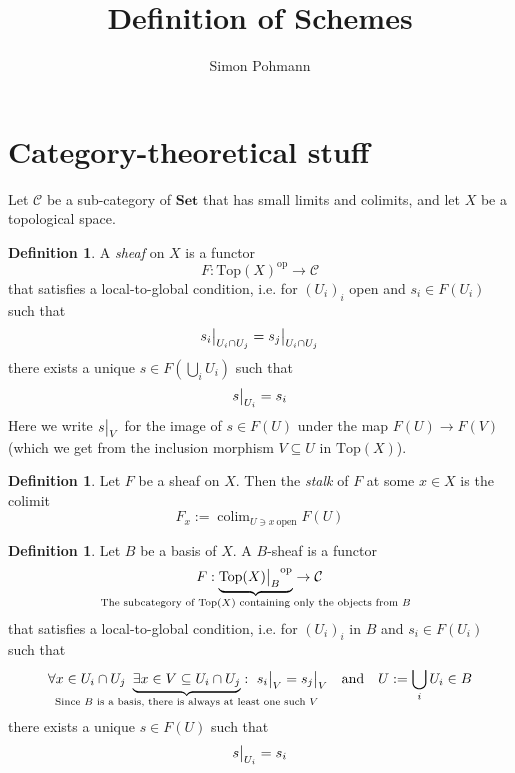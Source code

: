 \documentclass{scrartcl}
\title{Definition of Schemes}
\author{Simon Pohmann}
\newcommand{\Set}{\mathrm{\textbf{Set}}}
\newcommand{\Top}{\mathrm{Top}}
\DeclareMathOperator*{\colim}{colim}
\newcommand\restr[2]{{
    \left.\kern-\nulldelimiterspace
    #1
    \vphantom{\big|}
    \right|_{#2}
}}
\theoremstyle{definition}
\newtheorem{definition}[prop]{Definition}
\begin{document}
\maketitle
\tableofcontents

\section{Category-theoretical stuff}
Let $\mathcal{C}$ be a sub-category of $\Set$ that has small limits and colimits, and let $X$ be a topological space.
\begin{definition}
    A \emph{sheaf} on $X$ is a functor
    \begin{equation*}
        F: \Top(X)^{\mathrm{op}} \to \mathcal{C}
    \end{equation*}
    that satisfies a local-to-global condition, i.e. for $(U_i)_i$ open and $s_i \in F(U_i)$ such that
    \begin{equation*}
        \restr{s_i}{U_i \cap U_j} = \restr{s_j}{U_i \cap U_j}
    \end{equation*}
    there exists a unique $s \in F(\bigcup_i U_i)$ such that
    \begin{equation*}
        \restr{s}{U_i} = s_i
    \end{equation*}
    Here we write $\restr{s}{V}$ for the image of $s \in F(U)$ under the map $F(U) \to F(V)$ (which we get from the inclusion morphism $V \subseteq U$ in $\Top(X)$).
\end{definition}
\begin{definition}
    Let $F$ be a sheaf on $X$. Then the \emph{stalk} of $F$ at some $x \in X$ is the colimit
    \begin{equation*}
        F_x := \colim_{U \ni x \ \text{open}} F(U)
    \end{equation*}
\end{definition}
\begin{definition}
    Let $B$ be a basis of $X$.
    A $B$-sheaf is a functor
    \begin{equation*}
        F: \underbrace{\restr{\Top(X)}{B}^{\mathrm{op}}}_{\mathclap{\text{The subcategory of $\Top(X)$ containing only the objects from $B$}}} \to \mathcal{C}
    \end{equation*}
    that satisfies a local-to-global condition, i.e. for $(U_i)_i$ in $B$ and $s_i \in F(U_i)$ such that
    \begin{equation*}
        \forall x \in U_i \cap U_j \ \underbrace{\exists x \in V \subseteq U_i \cap U_j}_{\mathclap{\text{Since $B$ is a basis, there is always at least one such $V$}}}: \ \restr{s_i}{V} = \restr{s_j}{V} \quad \text{and} \quad U := \bigcup_i U_i \in B
    \end{equation*}
    there exists a unique $s \in F(U)$ such that
    \begin{equation*}
        \restr{s}{U_i} = s_i
    \end{equation*}
\end{definition}
\end{document}
